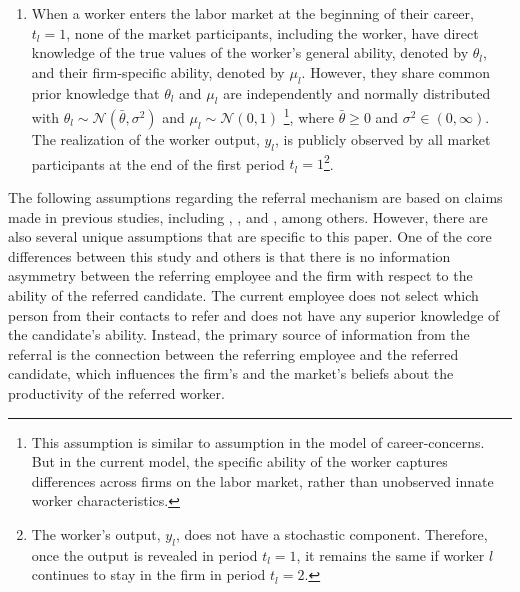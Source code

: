 \documentclass[12pt]{article}
\begin{document}
\begin{enumerate}[label={A}{\arabic*}.]
    \item When a worker enters the labor market at the beginning of their career, $t_l =1$, none of the market participants, including the worker, have direct knowledge of the true values of the worker's general ability, denoted by $\theta_l$, and their firm-specific ability, denoted by $\mu_l$. However, they share common prior knowledge that $\theta_l$ and $\mu_l$ are independently and normally distributed with $\theta_l \sim \mathcal{N}\left( \bar{\theta}, \sigma^2\right)$ and $\mu_l \sim \mathcal{N}\left( 0, 1\right)$ \footnote{This assumption is similar to \cite{ekinci2016employee} assumption in the model of career-concerns. But in the current model, the specific ability of the worker captures differences across firms on the labor market, rather than unobserved innate worker characteristics.}, where $\bar{\theta} \geq 0$ and $\sigma^2 \in (0, \infty)$. The realization of the worker output, $y_l$, is publicly observed by all market participants at the end of the first period $t_l = 1$\footnote{The worker's output, $y_l$, does not have a stochastic component. Therefore, once the output is revealed in period $t_l = 1$, it remains the same if worker $l$ continues to stay in the firm in period $t_l = 2$.}. %
\end{enumerate}

The following assumptions regarding the referral mechanism are based on claims made in previous studies, including \cite{friebel2023employee}, \cite{ekinci2016employee}, and \cite{lester2021heterogeneous}, among others. However, there are also several unique assumptions that are specific to this paper. One of the core differences between this study and others is that there is no information asymmetry between the referring employee and the firm with respect to the ability of the referred candidate. The current employee does not select which person from their contacts to refer and does not have any superior knowledge of the candidate's ability. Instead, the primary source of information from the referral is the connection between the referring employee and the referred candidate, which influences the firm's and the market's beliefs about the productivity of the referred worker.
\end{document}
